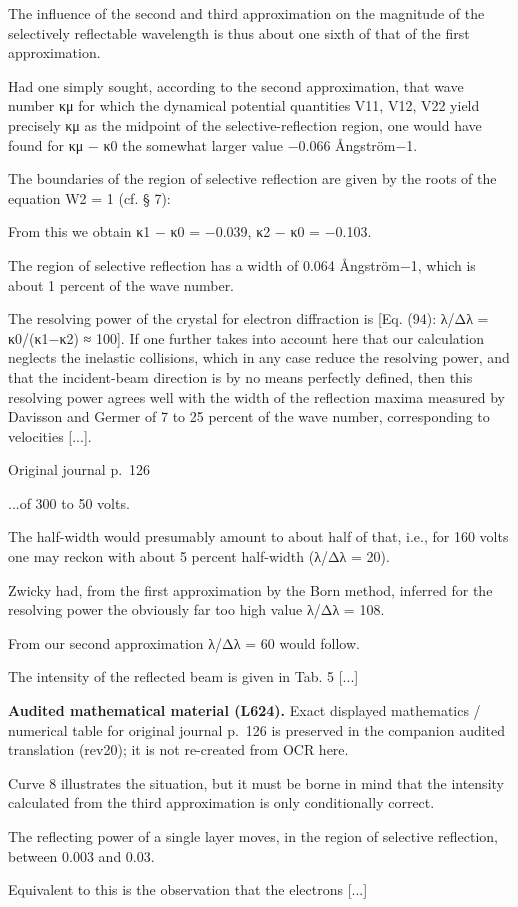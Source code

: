\documentclass[10pt]{article}
\newcommand{\origpage}[1]{\par\medskip\noindent\hfill{\small\color{notegray}Original journal p.~#1}\hfill\mbox{}\par\smallskip}
\newcommand{\mathref}[2]{\par\smallskip\noindent\colorbox{gray!8}{\parbox{0.95\linewidth}{\small\color{notegray}\textbf{Audited mathematical material (L#1).} Exact displayed mathematics / numerical table for original journal p.~#2 is preserved in the companion audited translation (rev20); it is not re-created from OCR here.}}\par\smallskip}
\begin{document}
The influence of the second and third approximation on the magnitude of the selectively reflectable wavelength is thus about one sixth of that of the first approximation.\par
Had one simply sought, according to the second approximation, that wave number κμ for which the dynamical potential quantities V11, V12, V22 yield precisely κμ as the midpoint of the selective-reflection region, one would have found for κμ − κ0 the somewhat larger value −0.066 Ångström−1.\par
The boundaries of the region of selective reflection are given by the roots of the equation W2 = 1 (cf. § 7):\par
[Equation.] From this we obtain κ1 − κ0 = −0.039, κ2 − κ0 = −0.103.\par
The region of selective reflection has a width of 0.064 Ångström−1, which is about 1 percent of the wave number.\par
The resolving power of the crystal for electron diffraction is [Eq. (94): λ/Δλ = κ0/(κ1−κ2) ≈ 100]. If one further takes into account here that our calculation neglects the inelastic collisions, which in any case reduce the resolving power, and that the incident-beam direction is by no means perfectly defined, then this resolving power agrees well with the width of the reflection maxima measured by Davisson and Germer of 7 to 25 percent of the wave number, corresponding to velocities [...].\par
\origpage{126}
...of 300 to 50 volts.\par
The half-width would presumably amount to about half of that, i.e., for 160 volts one may reckon with about 5 percent half-width (λ/Δλ = 20).\par
Zwicky had, from the first approximation by the Born method, inferred for the resolving power the obviously far too high value λ/Δλ = 108.\par
From our second approximation λ/Δλ = 60 would follow.\par
The intensity of the reflected beam is given in Tab. 5 [...]\par
\mathref{624}{126}
Curve 8 illustrates the situation, but it must be borne in mind that the intensity calculated from the third approximation is only conditionally correct.\par
The reflecting power of a single layer moves, in the region of selective reflection, between 0.003 and 0.03.\par
Equivalent to this is the observation that the electrons [...]\par
\end{document}
